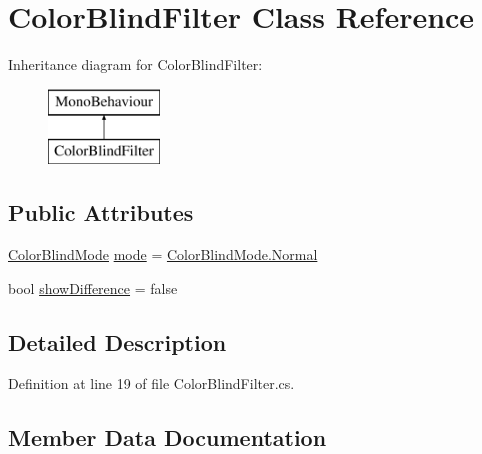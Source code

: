 \hypertarget{class_color_blind_filter}{}\section{Color\+Blind\+Filter Class Reference}
\label{class_color_blind_filter}
Inheritance diagram for Color\+Blind\+Filter\+:\begin{figure}[H]
\begin{center}
\leavevmode
\includegraphics[height=2.000000cm]{class_color_blind_filter}
\end{center}
\end{figure}
\subsection*{Public Attributes}
\begin{DoxyCompactItemize}
\item 
\mbox{\hyperlink{_color_blind_filter_8cs_a7e15f9c8e49d31776ea0e5d0b0480d1f}{Color\+Blind\+Mode}} \mbox{\hyperlink{class_color_blind_filter_a0cce087adbf6df510c1828d1ef685cfa}{mode}} = \mbox{\hyperlink{_color_blind_filter_8cs_a7e15f9c8e49d31776ea0e5d0b0480d1fa960b44c579bc2f6818d2daaf9e4c16f0}{Color\+Blind\+Mode.\+Normal}}
\item 
bool \mbox{\hyperlink{class_color_blind_filter_a2c4497e97ebf12ccf2cd94382737826b}{show\+Difference}} = false
\end{DoxyCompactItemize}


\subsection{Detailed Description}


Definition at line 19 of file Color\+Blind\+Filter.\+cs.



\subsection{Member Data Documentation}
\mbox{\label{class_color_blind_filter_a0cce087adbf6df510c1828d1ef685cfa}} 
